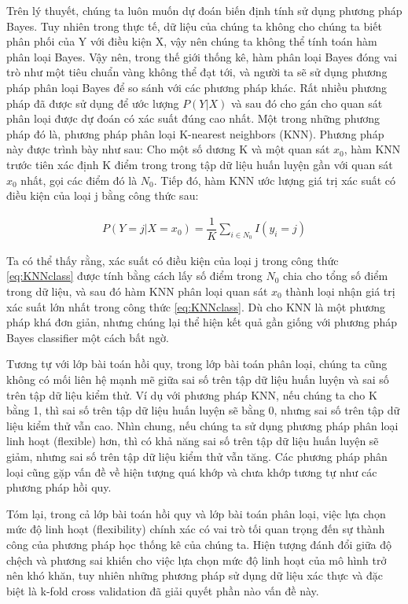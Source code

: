 \documentclass[
]{article}
\begin{document}
Trên lý thuyết, chúng ta luôn muốn dự đoán biến định tính sử dụng phương pháp Bayes. Tuy nhiên trong thực tế, dữ liệu của chúng ta không cho chúng ta biết phân phối của Y với điều kiện X, vậy nên chúng ta không thể tính toán hàm phân loại Bayes. Vậy nên, trong thế giới thống kê, hàm phân loại Bayes đóng vai trò như một tiêu chuẩn vàng không thể đạt tới, và người ta sẽ sử dụng phương pháp phân loại Bayes để so sánh với các phương pháp khác. Rất nhiều phương pháp đã được sử dụng để ước lượng \(P(Y|X)\) và sau đó cho gán cho quan sát phân loại được dự đoán có xác suất đúng cao nhất. Một trong những phương pháp đó là, phương pháp phân loại K-nearest neighbors (KNN). Phương pháp này được trình bày như sau: Cho một số dương K và một quan sát \(x_0\), hàm KNN trước tiên xác định K điểm trong trong tập dữ liệu huấn luyện gần với quan sát \(x_0\) nhất, gọi các điểm đó là \(N_0\). Tiếp đó, hàm KNN ước lượng giá trị xác suất có điều kiện của loại j bằng công thức sau:

\begin{align*}
P(Y = j|X = x_0) = \dfrac{1}{K} \sum\limits_{i \in N_0} I(y_i = j)
\label{eq:KNNclass}
\end{align*}

Ta có thể thấy rằng, xác suất có điều kiện của loại j trong công thức \eqref{eq:KNNclass} được tính bằng cách lấy số điểm trong \(N_0\) chia cho tổng số điểm trong dữ liệu, và sau đó hàm KNN phân loại quan sát \(x_0\) thành loại nhận giá trị xác suất lớn nhất trong công thức \eqref{eq:KNNclass}. Dù cho KNN là một phương pháp khá đơn giản, nhưng chúng lại thể hiện kết quả gần giống với phương pháp Bayes classifier một cách bất ngờ.

Tương tự với lớp bài toán hồi quy, trong lớp bài toán phân loại, chúng ta cũng không có mối liên hệ mạnh mẽ giữa sai số trên tập dữ liệu huấn luyện và sai số trên tập dữ liệu kiểm thử. Ví dụ với phương pháp KNN, nếu chúng ta cho K bằng 1, thì sai số trên tập dữ liệu huấn luyện sẽ bằng 0, nhưng sai số trên tập dữ liệu kiểm thử vẫn cao. Nhìn chung, nếu chúng ta sử dụng phương pháp phân loại linh hoạt (flexible) hơn, thì có khả năng sai số trên tập dữ liệu huấn luyện sẽ giảm, nhưng sai số trên tập dữ liệu kiểm thử vẫn tăng. Các phương pháp phân loại cũng gặp vấn đề về hiện tượng quá khớp và chưa khớp tương tự như các phương pháp hồi quy.

Tóm lại, trong cả lớp bài toán hồi quy và lớp bài toán phân loại, việc lựa chọn mức độ linh hoạt (flexibility) chính xác có vai trò tối quan trọng đến sự thành công của phương pháp học thống kê của chúng ta. Hiện tượng đánh đổi giữa độ chệch và phương sai khiến cho việc lựa chọn mức độ linh hoạt của mô hình trở nên khó khăn, tuy nhiên những phương pháp sử dụng dữ liệu xác thực và
đặc biệt là k-fold cross validation đã giải quyết phần nào vấn đề này.
\end{document}
